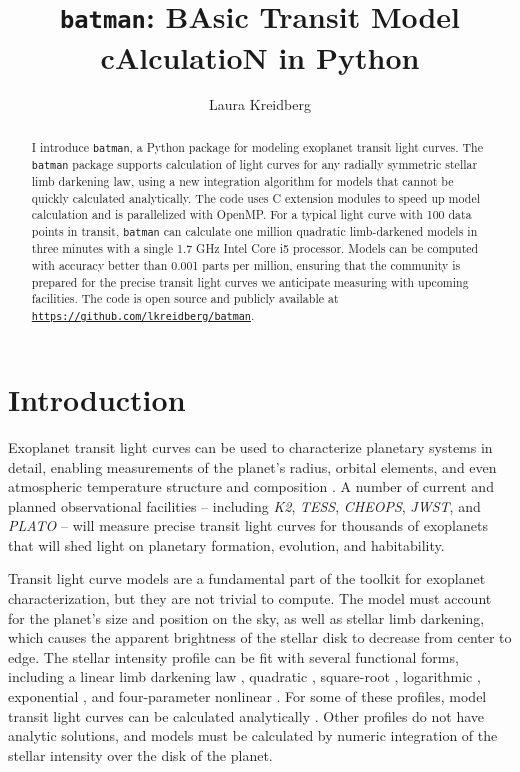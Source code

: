 \documentclass[12pt,preprint]{aastex}
\newcommand*{\blue}{\textcolor{blue}}
\begin{document}
\title{\texttt{batman}: BAsic Transit Model cAlculatioN in Python} 

\author{Laura Kreidberg}



\begin{abstract}
I introduce \texttt{batman}, a Python package for modeling exoplanet transit light curves.  The \texttt{batman} package supports calculation of light curves for any radially symmetric stellar limb darkening law, using a new integration algorithm for models that cannot be quickly calculated analytically.  The code uses C extension modules to speed up model calculation and is parallelized with OpenMP.  For a typical light curve with 100 data points in transit, \texttt{batman} can calculate one million quadratic limb-darkened models in three minutes with a single 1.7 GHz Intel Core i5 processor.  Models can be computed with accuracy better than 0.001 parts per million, ensuring that the community is prepared for the precise transit light curves we anticipate measuring with upcoming facilities.  The code is open source and publicly available at \texttt{\blue{\url{https://github.com/lkreidberg/batman}}}.
\end{abstract}


\section{Introduction}
Exoplanet transit light curves can be used to characterize planetary systems in detail, enabling measurements of the planet's radius, orbital elements, and even atmospheric temperature structure and composition \citep{seager00, seager03}.  A number of current and planned observational facilities -- including \emph{K2}, \emph{TESS}, \emph{CHEOPS}, \emph{JWST}, and \emph{PLATO} -- will measure precise transit light curves for thousands of exoplanets that will shed light on planetary formation, evolution, and habitability.

Transit light curve models are a fundamental part of the toolkit for exoplanet characterization, but they are not trivial to compute.  The model must account for the planet's size and position on the sky, as well as stellar limb darkening, which causes the apparent brightness of the stellar disk to decrease from center to edge.  The  stellar intensity profile can be fit with several functional forms, including a linear limb darkening law \citep{schwarzschild06}, quadratic \citep{kopal50}, square-root \citep{diaz-cordoves92}, logarithmic \citep{klinglesmith70}, exponential \citep{claret03}, and four-parameter nonlinear \citep{claret00}.  For some of these profiles, model transit light curves can be calculated analytically \citep{mandel02, gimenez06, abubekerov13}.  Other profiles do not have analytic solutions, and models must be calculated by numeric integration of the stellar intensity over the disk of the planet. 
\end{document}

